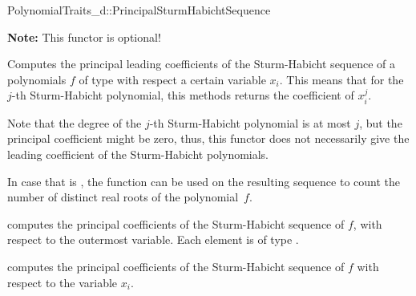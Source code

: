 \begin{ccRefConcept}{PolynomialTraits_d::PrincipalSturmHabichtSequence}

\textbf{Note:} This functor is optional!

\ccDefinition

Computes the principal leading coefficients of the Sturm-Habicht sequence 
of a polynomials $f$ of type  
with respect a certain variable $x_i$.
This means that for the $j$-th Sturm-Habicht polynomial, this methods returns
the coefficient of $x_i^j$. 

Note that the degree of the $j$-th Sturm-Habicht polynomial is at most $j$,
but the principal coefficient might be zero, thus, this functor does not
necessarily give the leading coefficient of the Sturm-Habicht polynomials.

In case that  is , the function  can be used
on the resulting sequence to count the number of distinct real roots of
the polynomial~$f$.


\ccOperations
{}
         { computes the principal coefficients of the 
           Sturm-Habicht sequence of $f$, 
           with respect to the outermost variable. Each element is of type
           .}

         { computes the principal coefficients 
           of the Sturm-Habicht sequence of $f$ 
           with respect to the variable $x_i$.}


\ccSeeAlso

\\
\\
\\

\end{ccRefConcept}
